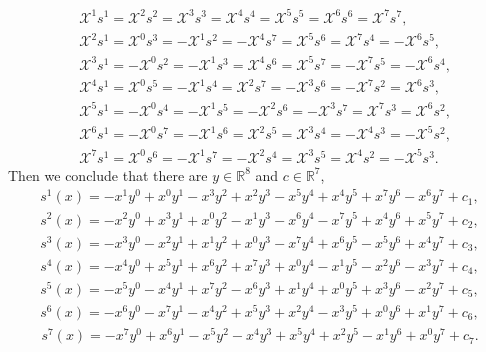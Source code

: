 \documentclass[reqno,12pt]{amsart}
\numberwithin{equation}{section}
\theoremstyle{plain}
\theoremstyle{definition}
\begin{document}
   \small{ \begin{align*}
         &\mathscr{X}^1 s^1=\mathscr{X}^2 s^2=\mathscr{X}^3 s^3=\mathscr{X}^4s^4=\mathscr{X}^5s^5=\mathscr{X}^6 s^6=\mathscr{X}^7 s^7,\\& \mathscr{X}^2 s^1=\mathscr{X}^0s^3=-\mathscr{X}^1 s^2=-\mathscr{X}^4 s^7=\mathscr{X}^5 s^6=\mathscr{X}^7 s^4=-\mathscr{X}^6 s^5,\\&
          \mathscr{X}^3 s^1=-\mathscr{X}^0 s^2=-\mathscr{X}^1 s^3=\mathscr{X}^4 s^6=\mathscr{X}^5 s^7=-\mathscr{X}^7s^5=-\mathscr{X}^6s^4, \\&          
          \mathscr{X}^4 s^1=\mathscr{X}^0 s^5=-\mathscr{X}^1 s^4=   \mathscr{X}^2 s^7=-\mathscr{X}^3 s^6=-\mathscr{X}^7 s^2=\mathscr{X}^6s^3,\\& \mathscr{X}^5 s^1=-\mathscr{X}^0 s^4=-\mathscr{X}^1 s^5=-\mathscr{X}^2 s^6=-\mathscr{X}^3 s^7=\mathscr{X}^7 s^3=\mathscr{X}^6 s^2, \\& \mathscr{X}^6s^1=-\mathscr{X}^0 s^7=-\mathscr{X}^1 s^6=\mathscr{X}^2 s^5=\mathscr{X}^3 s^4=-\mathscr{X}^4 s^3=-\mathscr{X}^5 s^2 , \\& \mathscr{X}^7 s^1=\mathscr{X}^0s^6=-\mathscr{X}^1 s^7=-\mathscr{X}^2 s^4=\mathscr{X}^3 s^5=\mathscr{X}^4 s^2=-\mathscr{X}^5 s^3.\end{align*}}
Then we conclude that there are $y\in \mathbb{R}^{8}$ and $c\in \mathbb{R}^7$,
\small{
\begin{align*}
    s^1(x)=-x^1 y^0+x^0 y^1-x^3y^2+x^2 y^3-x^5 y^4+x^4 y^5+x^7 y^6 -x^6 y^7+c_1,
\end{align*}
\begin{align*}
    s^2(x)=-x^2 y^0+x^3 y^1+x^0y^2-x^1 y^3-x^6 y^4-x^7 y^5+x^4 y^6 +x^5 y^7+c_2,
\end{align*}
\begin{align*}
    s^3(x)=-x^3y^0-x^2 y^1+x^1y^2+x^0 y^3-x^7y^4+x^6 y^5-x^5y^6+x^4 y^7+c_3,
\end{align*}
\begin{align*}
    s^4(x)=-x^4 y^0+x^5 y^1+x^6y^2+x^7 y^3+x^0y^4-x^1y^5-x^2 y^6-x^3 y^7+c_4,
\end{align*}
\begin{align*}
    s^5(x)=-x^5 y^0-x^4 y^1+x^7y^2-x^6 y^3+x^1 y^4+x^0 y^5+x^3 y^6-x^2 y^7+c_5,
\end{align*}
\begin{align*}
    s^6(x)=-x^6y^0-x^7 y^1-x^4y^2+x^5 y^3+x^2 y^4-x^3y^5+x^0y^6+x^1y^7+c_6,
\end{align*}
\begin{align*}
    s^7(x)=-x^7 y^0+x^6 y^1-x^5y^2-x^4 y^3+x^5y^4+x^2 y^5-x^1 y^6 +x^0 y^7+c_7.
\end{align*}}
\end{document}
